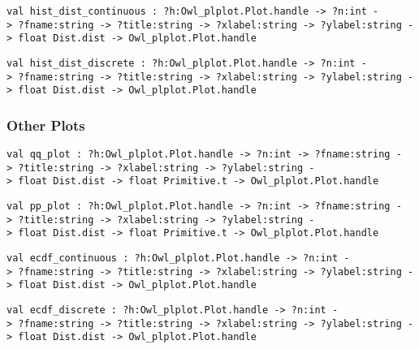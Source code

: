\protect\hyperlink{val-histux5fdistux5fcontinuous}{}\texttt{val\ hist\_dist\_continuous\ :\ ?⁠h:Owl\_plplot.Plot.handle\ -\textgreater{}\ ?⁠n:int\ -\textgreater{}\ ?⁠fname:string\ -\textgreater{}\ ?⁠title:string\ -\textgreater{}\ ?⁠xlabel:string\ -\textgreater{}\ ?⁠ylabel:string\ -\textgreater{}\ float\ Dist.dist\ -\textgreater{}\ Owl\_plplot.Plot.handle}

\protect\hyperlink{val-histux5fdistux5fdiscrete}{}\texttt{val\ hist\_dist\_discrete\ :\ ?⁠h:Owl\_plplot.Plot.handle\ -\textgreater{}\ ?⁠n:int\ -\textgreater{}\ ?⁠fname:string\ -\textgreater{}\ ?⁠title:string\ -\textgreater{}\ ?⁠xlabel:string\ -\textgreater{}\ ?⁠ylabel:string\ -\textgreater{}\ float\ Dist.dist\ -\textgreater{}\ Owl\_plplot.Plot.handle}

\hypertarget{otherux5fplots}{\subsubsection{\texorpdfstring{\protect\hyperlink{otherux5fplots}{}Other
Plots}{Other Plots}}\label{otherux5fplots}}

\protect\hyperlink{val-qqux5fplot}{}\texttt{val\ qq\_plot\ :\ ?⁠h:Owl\_plplot.Plot.handle\ -\textgreater{}\ ?⁠n:int\ -\textgreater{}\ ?⁠fname:string\ -\textgreater{}\ ?⁠title:string\ -\textgreater{}\ ?⁠xlabel:string\ -\textgreater{}\ ?⁠ylabel:string\ -\textgreater{}\ float\ Dist.dist\ -\textgreater{}\ float\ Primitive.t\ -\textgreater{}\ Owl\_plplot.Plot.handle}

\protect\hyperlink{val-ppux5fplot}{}\texttt{val\ pp\_plot\ :\ ?⁠h:Owl\_plplot.Plot.handle\ -\textgreater{}\ ?⁠n:int\ -\textgreater{}\ ?⁠fname:string\ -\textgreater{}\ ?⁠title:string\ -\textgreater{}\ ?⁠xlabel:string\ -\textgreater{}\ ?⁠ylabel:string\ -\textgreater{}\ float\ Dist.dist\ -\textgreater{}\ float\ Primitive.t\ -\textgreater{}\ Owl\_plplot.Plot.handle}

\protect\hyperlink{val-ecdfux5fcontinuous}{}\texttt{val\ ecdf\_continuous\ :\ ?⁠h:Owl\_plplot.Plot.handle\ -\textgreater{}\ ?⁠n:int\ -\textgreater{}\ ?⁠fname:string\ -\textgreater{}\ ?⁠title:string\ -\textgreater{}\ ?⁠xlabel:string\ -\textgreater{}\ ?⁠ylabel:string\ -\textgreater{}\ float\ Dist.dist\ -\textgreater{}\ Owl\_plplot.Plot.handle}

\protect\hyperlink{val-ecdfux5fdiscrete}{}\texttt{val\ ecdf\_discrete\ :\ ?⁠h:Owl\_plplot.Plot.handle\ -\textgreater{}\ ?⁠n:int\ -\textgreater{}\ ?⁠fname:string\ -\textgreater{}\ ?⁠title:string\ -\textgreater{}\ ?⁠xlabel:string\ -\textgreater{}\ ?⁠ylabel:string\ -\textgreater{}\ float\ Dist.dist\ -\textgreater{}\ Owl\_plplot.Plot.handle}

